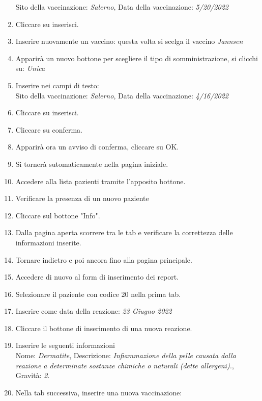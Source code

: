 \documentclass[11pt]{article}
\begin{document}
\begin{enumerate}
                        Sito della vaccinazione: \textit{Salerno}, Data della vaccinazione: \textit{5/20/2022}
                \item Cliccare su inserisci.
                \item Inserire nuovamente un vaccino: questa volta si scelga il vaccino \textit{Jannsen}
                \item Apparirà un nuovo bottone per scegliere il tipo di somministrazione, si clicchi su: \textit{Unica}
                \item Inserire nei campi di testo:\\
                    Sito della vaccinazione: \textit{Salerno}, Data della vaccinazione: \textit{4/16/2022}
                \item Cliccare su inserisci.
                \item Cliccare su conferma.
                \item Apparirà ora un avviso di conferma, cliccare su OK.
                \item Si tornerà sutomaticamente nella pagina iniziale. 
                \item Accedere alla lista pazienti tramite l'apposito bottone.
                \item Verificare la presenza di un nuovo paziente
                \item Cliccare sul bottone "Info".
                \item Dalla pagina aperta scorrere tra le tab e verificare la correttezza delle informazioni inserite.
                \item Tornare indietro e poi ancora fino alla pagina principale.
                \item Accedere di nuovo al form di inserimento dei report.
                \item Selezionare il paziente con codice 20 nella prima tab.
                \item Inserire come data della reazione: \textit{23 Giugno 2022}
                \item Cliccare il bottone di inserimento di una nuova reazione.
                \item Inserire le seguenti informazioni\\ 
                        Nome: \textit{Dermatite}, Descrizione: \textit{Infiammazione della pelle causata dalla reazione a determinate sostanze chimiche o naturali (dette allergeni).}, Gravità: \textit{2}.
                \item Nella tab successiva, inserire una nuova vaccinazione:\\

\end{enumerate}
\end{document}
